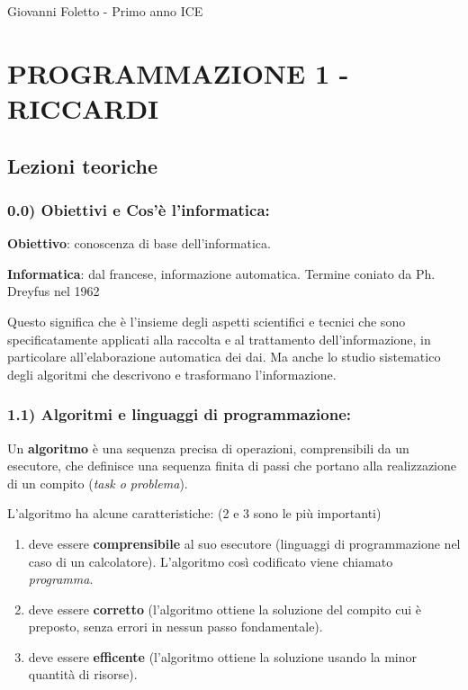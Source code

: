 \documentclass[
  paper=a4,
  oneside  ,captions=tableheading
]{scrbook}
\providecommand{\tightlist}{%
  \setlength{\itemsep}{0pt}\setlength{\parskip}{0pt}}
\begin{document}



Giovanni Foletto - Primo anno ICE

\hypertarget{programmazione-1---riccardi}{%
\section{PROGRAMMAZIONE 1 -
RICCARDI}\label{programmazione-1---riccardi}}

\hypertarget{lezioni-teoriche}{%
\subsection{Lezioni teoriche}\label{lezioni-teoriche}}

\hypertarget{obiettivi-e-cosuxe8-linformatica}{%
\subsubsection{0.0) Obiettivi e Cos'è
l'informatica:}\label{obiettivi-e-cosuxe8-linformatica}}

\hspace{0pt} \textbf{Obiettivo}: conoscenza di base dell'informatica.

\hspace{0pt} \textbf{Informatica}: dal francese, informazione
automatica. Termine coniato da Ph. Dreyfus nel 1962

\hspace{0pt} Questo significa che è l'insieme degli aspetti scientifici
e tecnici che sono specificatamente applicati alla raccolta e al
trattamento dell'informazione, in particolare all'elaborazione
automatica dei dai. Ma anche lo studio sistematico degli algoritmi che
descrivono e trasformano l'informazione.

\hypertarget{algoritmi-e-linguaggi-di-programmazione}{%
\subsubsection{1.1) Algoritmi e linguaggi di
programmazione:}\label{algoritmi-e-linguaggi-di-programmazione}}

Un \textbf{algoritmo} è una sequenza precisa di operazioni,
comprensibili da un esecutore, che definisce una sequenza finita di
passi che portano alla realizzazione di un compito (\emph{task o
problema}).

L'algoritmo ha alcune caratteristiche: (2 e 3 sono le più importanti)

\begin{enumerate}
\def\labelenumi{\arabic{enumi}.}
\tightlist
\item
  deve essere \textbf{comprensibile} al suo esecutore (linguaggi di
  programmazione nel caso di un calcolatore). L'algoritmo così
  codificato viene chiamato \emph{programma}.
\item
  deve essere \textbf{corretto } (l'algoritmo ottiene la soluzione del
  compito cui è preposto, senza errori in nessun passo fondamentale).
\item
  deve essere \textbf{efficente} (l'algoritmo ottiene la soluzione
  usando la minor quantità di risorse).
\end{enumerate}
\end{document}
